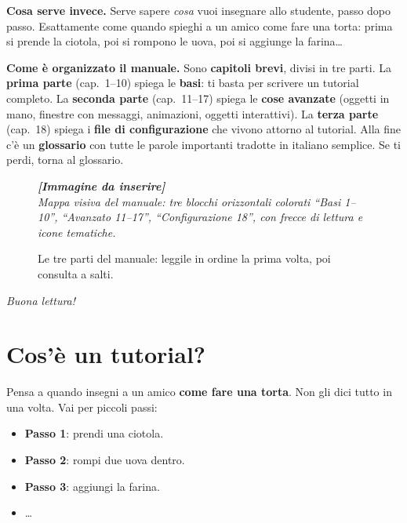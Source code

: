 ﻿\documentclass[a4paper,12pt,oneside]{book}
\newcommand{\imgph}[2]{%
  \begin{tcolorbox}[colback=cvtlightblue!30,colframe=cvtblue!40,%
    width=#1,halign=center,valign=center,height=5cm,boxrule=0.5pt,arc=3pt]%
    \textcolor{cvtgray}{\itshape\footnotesize\textbf{[Immagine da inserire]}\\[3pt]#2}%
  \end{tcolorbox}}
\begin{document}
\medskip
\textbf{Cosa serve invece.} Serve sapere \emph{cosa} vuoi insegnare allo studente,
passo dopo passo. Esattamente come quando spieghi a un amico come fare una torta:
prima si prende la ciotola, poi si rompono le uova, poi si aggiunge la farina\ldots

\medskip
\textbf{Come è organizzato il manuale.} Sono \textbf{capitoli brevi}, divisi in
tre parti. La \textbf{prima parte} (cap.\ 1--10) spiega le \textbf{basi}: ti
basta per scrivere un tutorial completo. La \textbf{seconda parte}
(cap.\ 11--17) spiega le \textbf{cose avanzate} (oggetti in mano, finestre con
messaggi, animazioni, oggetti interattivi). La \textbf{terza parte}
(cap.\ 18) spiega i \textbf{file di configurazione} che vivono attorno al
tutorial. Alla fine c'è un \textbf{glossario} con tutte le parole importanti
tradotte in italiano semplice. Se ti perdi, torna al glossario.

\begin{figure}[H]
  \centering
  \imgph{12cm}{Mappa visiva del manuale: tre blocchi orizzontali colorati ``Basi 1--10'', ``Avanzato 11--17'', ``Configurazione 18'', con frecce di lettura e icone tematiche.}
  \caption{Le tre parti del manuale: leggile in ordine la prima volta, poi consulta a salti.}
  \label{fig:mappa-manuale}
\end{figure}

\vfill
\begin{center}
\textit{Buona lettura!}
\end{center}
\clearpage

\tableofcontents

\mainmatter
\pagestyle{fancy}

\chapter{Cos'è un tutorial?}
\label{ch:intro}

Pensa a quando insegni a un amico \textbf{come fare una torta}. Non gli dici tutto
in una volta. Vai per piccoli passi:

\begin{itemize}
  \item \textbf{Passo 1}: prendi una ciotola.
  \item \textbf{Passo 2}: rompi due uova dentro.
  \item \textbf{Passo 3}: aggiungi la farina.
  \item \ldots
\end{itemize}
\end{document}
